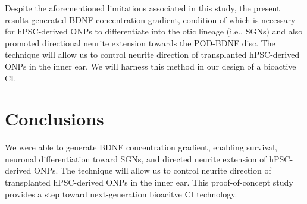 \documentclass[review]{elsarticle}
\begin{document}
\indent Despite the aforementioned limitations associated in this study, the present results generated BDNF concentration gradient, condition of which is necessary for hPSC-derived ONPs to differentiate into the otic lineage (i.e., SGNs) and also promoted directional neurite extension towards the POD-BDNF disc. The technique will allow us to control neurite direction of transplanted hPSC-derived ONPs in the inner ear. We will harness this method in our design of a bioactive CI. 


\section* {Conclusions}
We were able to generate BDNF concentration gradient, enabling survival, neuronal differentiation toward SGNs, and directed neurite extension of hPSC-derived ONPs. The technique will allow us to control neurite direction of transplanted hPSC-derived ONPs in the inner ear. This proof-of-concept study provides a step toward next-generation bioacitve CI technology. 
\end{document}
